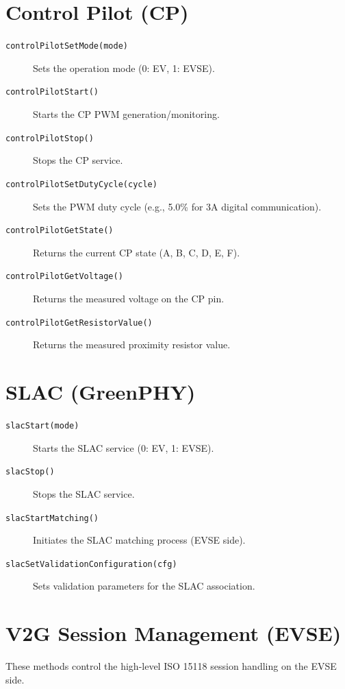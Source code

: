 \documentclass[a4paper,11pt]{report}
\begin{document}
\section{Control Pilot (CP)}
\begin{description}
    \item[\texttt{controlPilotSetMode(mode)}] Sets the operation mode (0: EV, 1: EVSE).
    \item[\texttt{controlPilotStart()}] Starts the CP PWM generation/monitoring.
    \item[\texttt{controlPilotStop()}] Stops the CP service.
    \item[\texttt{controlPilotSetDutyCycle(cycle)}] Sets the PWM duty cycle (e.g., 5.0\% for 3A digital communication).
    \item[\texttt{controlPilotGetState()}] Returns the current CP state (A, B, C, D, E, F).
    \item[\texttt{controlPilotGetVoltage()}] Returns the measured voltage on the CP pin.
    \item[\texttt{controlPilotGetResistorValue()}] Returns the measured proximity resistor value.
\end{description}

\section{SLAC (GreenPHY)}
\begin{description}
    \item[\texttt{slacStart(mode)}] Starts the SLAC service (0: EV, 1: EVSE).
    \item[\texttt{slacStop()}] Stops the SLAC service.
    \item[\texttt{slacStartMatching()}] Initiates the SLAC matching process (EVSE side).
    \item[\texttt{slacSetValidationConfiguration(cfg)}] Sets validation parameters for the SLAC association.
\end{description}

\section{V2G Session Management (EVSE)}
These methods control the high-level ISO 15118 session handling on the EVSE side.
\end{document}
